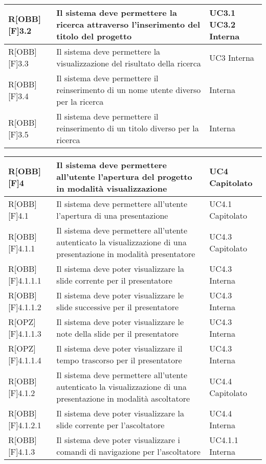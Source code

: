 \begin{table}[H]
\begin{tabular}{|p{}|p{}|p{}|}
			R[OBB][F]3.2 & Il sistema deve permettere la ricerca attraverso
			l'inserimento del titolo del progetto & UC3.1 UC3.2 Interna\\ \midrule 
			R[OBB][F]3.3 & Il sistema deve permettere la visualizzazione del risultato della ricerca & UC3 Interna\\ \midrule 
			R[OBB][F]3.4 & Il sistema deve permettere il reinserimento di un nome utente diverso per la ricerca & Interna\\ \midrule 
			R[OBB][F]3.5 & Il sistema deve permettere il reinserimento di un titolo diverso per la ricerca & Interna\\ \midrule 
		\end{tabular}
	\end{table}
	\newpage

	\begin{table}[H]
		\begin{tabular}{|p{}|p{}|p{}|}
			\midrule
			R[OBB][F]4 & Il sistema deve permettere all'utente l'apertura del progetto in modalità visualizzazione & UC4 Capitolato\\ \midrule 
			R[OBB][F]4.1 & Il sistema deve permettere all'utente l'apertura di
			una presentazione & UC4.1 Capitolato\\ \midrule 
			R[OBB][F]4.1.1 & Il sistema deve permettere all'utente autenticato
			la visualizzazione di una presentazione in modalità
			presentatore & UC4.3 Capitolato\\ \midrule 
			R[OBB][F]4.1.1.1 & Il sistema deve poter visualizzare la slide corrente
			per il presentatore & UC4.3 Interna\\ \midrule 
			R[OBB][F]4.1.1.2 & Il sistema deve poter visualizzare le slide successive
			per il presentatore & UC4.3 Interna\\ \midrule 
			R[OPZ][F]4.1.1.3 & Il sistema deve poter visualizzare le note della slide per il presentatore & UC4.3 Interna\\ \midrule 
			R[OPZ][F]4.1.1.4 & Il sistema deve poter visualizzare il tempo trascorso per il presentatore & UC4.3 Interna\\ \midrule 
			R[OBB][F]4.1.2 & Il sistema deve permettere all'utente autenticato
			la visualizzazione di una presentazione in modalità
			ascoltatore & UC4.4 Capitolato\\ \midrule 
			R[OBB][F]4.1.2.1 & Il sistema deve poter visualizzare la slide corrente
			per l'ascoltatore & UC4.4 Interna\\ \midrule 
			R[OBB][F]4.1.3 & Il sistema deve poter visualizzare i comandi di navigazione per l'ascoltatore & UC4.1.1 Interna\\ \midrule 

\end{tabular}
\end{table}
